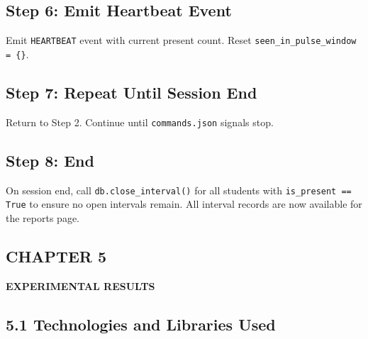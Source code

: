 \documentclass{report}
\begin{document}
\subsection*{Step 6: Emit Heartbeat Event}
Emit \texttt{HEARTBEAT} event with current present count. Reset \texttt{seen\_in\_pulse\_window = \{\}}.

\subsection*{Step 7: Repeat Until Session End}
Return to Step 2. Continue until \texttt{commands.json} signals stop.

\subsection*{Step 8: End}
On session end, call \texttt{db.close\_interval()} for all students with \texttt{is\_present == True}\vspace{3pt} to ensure no open intervals remain. All interval records are now available for the reports page.

\newpage
\begin{center}
    \section*{\textbf{CHAPTER 5}}
\end{center}
\begin{center}
    \textbf{\Large EXPERIMENTAL RESULTS}\\[20pt]
\end{center}

\subsection*{5.1 Technologies and Libraries Used}
\end{document}
